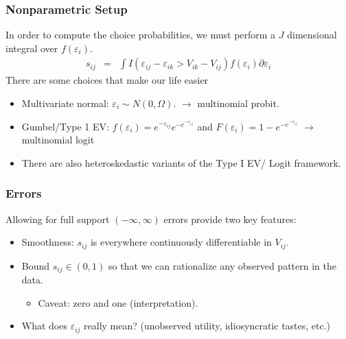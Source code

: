 \documentclass[xcolor=pdftex,dvipsnames,table,mathserif,aspectratio=169]{beamer}
\begin{document}
\begin{frame}
\frametitle{Nonparametric Setup}
In order to compute the choice probabilities, we must perform a $J$ dimensional integral over $f(\varepsilon_i)$.
\begin{eqnarray*}
s_{ij} &=&  \int I( \varepsilon_{ij}-\varepsilon_{ik} > V_{ik} - V_{ij} ) f( \varepsilon_i) \partial \varepsilon_i
\end{eqnarray*}
There are some choices that make our life easier
\begin{itemize}
\item Multivariate normal: $\varepsilon_i  \sim N(0,\Omega)$. $\longrightarrow$ \alert{ multinomial probit}.
\item Gumbel/Type 1 EV: $f(\varepsilon_i) = e^{-\varepsilon_{ij}}  e^{-e^{-\varepsilon_{ij}}}  $ and $F(\varepsilon_i) = 1- e^{-e^{-\varepsilon_{ij}}}$ $\longrightarrow$ \alert{multinomial logit}
\item There are also heteroskedastic variants of the Type I EV/ Logit framework.
\end{itemize}
\end{frame}

\begin{frame}
\frametitle{Errors}
Allowing for full support $(-\infty, \infty)$ errors provide two key features:
\begin{itemize}
\item Smoothness: $s_{ij}$ is everywhere continuously differentiable in $V_{ij}$.
\item Bound $s_{ij} \in (0,1)$ so that we can rationalize any observed pattern in the data.
\begin{itemize}
\item Caveat: zero and one (interpretation).
\end{itemize}
\item What does $\varepsilon_{ij}$ really mean? (unobserved utility, idiosyncratic tastes, etc.)
\end{itemize}
\end{frame}
\end{document}
